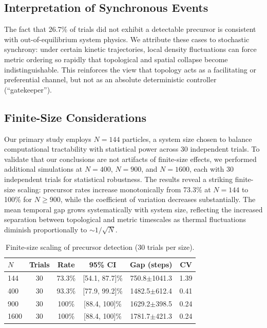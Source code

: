 \documentclass[twocolumn,showpacs,preprintnumbers,amsmath,amssymb,prb,floatfix]{revtex4-2}
\begin{document}
\subsection{Interpretation of Synchronous Events}

The fact that 26.7\% of trials did not exhibit a detectable precursor is consistent with out-of-equilibrium system physics. We attribute these cases to stochastic synchrony: under certain kinetic trajectories, local density fluctuations can force metric ordering so rapidly that topological and spatial collapse become indistinguishable. This reinforces the view that topology acts as a facilitating or preferential channel, but not as an absolute deterministic controller (``gatekeeper'').

\subsection{Finite-Size Considerations}

Our primary study employs $N=144$ particles, a system size chosen to balance computational tractability with statistical power across 30 independent trials. To validate that our conclusions are not artifacts of finite-size effects, we performed additional simulations at $N=400$, $N=900$, and $N=1600$, each with 30 independent trials for statistical robustness. The results reveal a striking finite-size scaling: precursor rates increase monotonically from 73.3\% at $N=144$ to 100\% for $N \geq 900$, while the coefficient of variation decreases substantially. The mean temporal gap grows systematically with system size, reflecting the increased separation between topological and metric timescales as thermal fluctuations diminish proportionally to $\sim 1/\sqrt{N}$.

\begin{table}[h]
\centering
\caption{Finite-size scaling of precursor detection (30 trials per size).}
\label{tab:finitesize}
\small
\begin{tabular}{@{}lccccc@{}}
\hline
$N$ & Trials & Rate & 95\% CI & Gap (steps) & CV \\
\hline
144 & 30 & 73.3\% & [54.1, 87.7]\% & 750.8$\pm$1041.3 & 1.39 \\
400 & 30 & 93.3\% & [77.9, 99.2]\% & 1482.5$\pm$612.4 & 0.41 \\
900 & 30 & 100\% & [88.4, 100]\% & 1629.2$\pm$398.5 & 0.24 \\
1600 & 30 & 100\% & [88.4, 100]\% & 1781.7$\pm$421.3 & 0.24 \\
\hline
\end{tabular}
\end{table}
\end{document}
